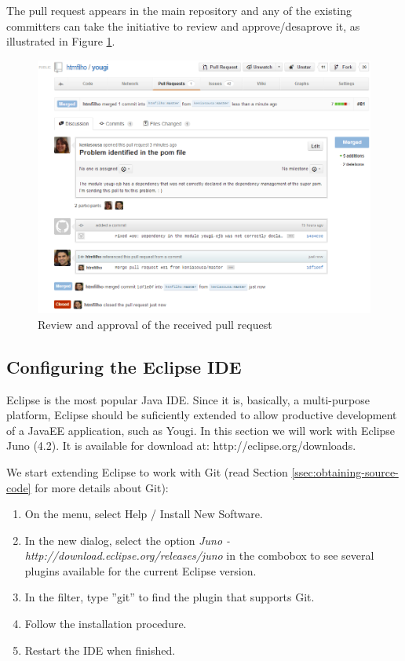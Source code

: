 \documentclass[envcountsame,envcountchap]{svmono}
\begin{document}
The pull request appears in the main repository and any of the existing committers can take the initiative to review and approve/desaprove it, as illustrated in Figure \ref{fig:github-pull-request-merged-closed}.

\begin{figure}
\centering
\includegraphics[scale=.46]{figures/github-pull-request-merged-closed}
\caption{Review and approval of the received pull request}
\label{fig:github-pull-request-merged-closed}
\end{figure}

\subsection{Configuring the Eclipse IDE}

Eclipse is the most popular Java IDE. Since it is, basically, a multi-purpose platform, Eclipse should be suficiently extended to allow productive development of a JavaEE application, such as Yougi. In this section we will work with Eclipse Juno (4.2). It is available for download at: http://eclipse.org/downloads.

We start extending Eclipse to work with Git (read Section \ref{ssec:obtaining-source-code} for more details about Git):
\begin{enumerate}
\item On the menu, select Help / Install New Software.
\item In the new dialog, select the option \textit{Juno - http://download.eclipse.org/releases/juno} in the combobox to see several plugins available for the current Eclipse version.
\item In the filter, type ''git'' to find the plugin that supports Git.
\item Follow the installation procedure.
\item Restart the IDE when finished.
\end{enumerate}
\end{document}
